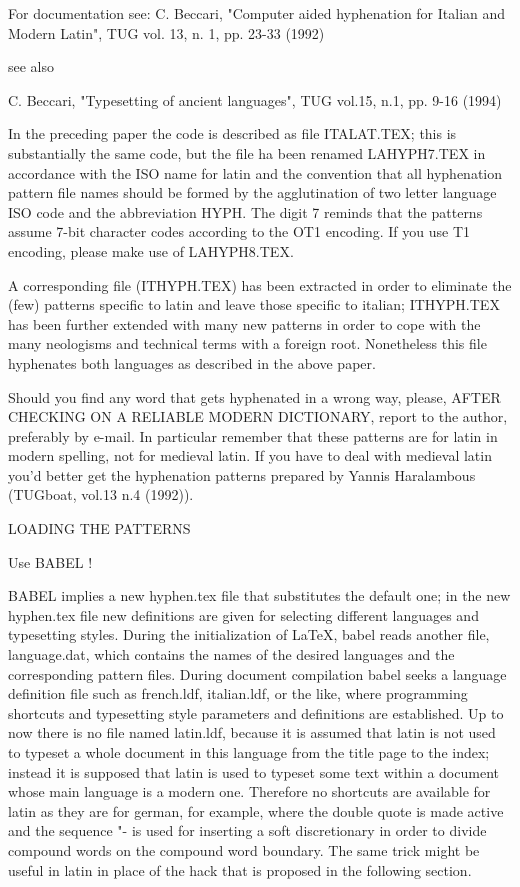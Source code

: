  For documentation see:
 C. Beccari, "Computer aided hyphenation for Italian and Modern
       Latin", TUG vol. 13, n. 1, pp. 23-33 (1992)

 see also

 C. Beccari, "Typesetting of ancient languages",
             TUG vol.15, n.1, pp. 9-16 (1994)

 In the preceding paper the code is described as file ITALAT.TEX; this is
 substantially the same code, but the file ha been renamed LAHYPH7.TEX
 in accordance with the ISO name for latin and the convention that all
 hyphenation pattern file names should be formed by the agglutination of
 two letter language ISO code and the abbreviation HYPH. The digit 7
 reminds that the patterns assume 7-bit character codes according to the
 OT1 encoding. If you use T1 encoding, please make use of LAHYPH8.TEX.

 A corresponding file (ITHYPH.TEX) has been extracted in order to eliminate
 the (few) patterns specific to latin and leave those specific to italian;
 ITHYPH.TEX has been further extended with many new patterns in order to
 cope with the many neologisms and technical terms with a foreign root.
 Nonetheless this file hyphenates both languages as described in the above
 paper.

 Should you find any word that gets hyphenated in a wrong way, please, AFTER
 CHECKING ON A RELIABLE MODERN DICTIONARY, report to the author, preferably
 by e-mail. In particular remember that these patterns are for latin in
 modern spelling, not for medieval latin. If you have to deal with medieval
 latin you'd better get the hyphenation patterns prepared by Yannis
 Haralambous (TUGboat, vol.13 n.4 (1992)).

 LOADING THE PATTERNS

 Use BABEL !

 BABEL implies a new hyphen.tex file that substitutes the default one; in
 the new hyphen.tex file new definitions are given for selecting different
 languages and typesetting styles. During the initialization of LaTeX,
 babel reads another  file, language.dat, which contains the names of
 the desired languages and the corresponding pattern files. During
 document compilation babel seeks a language definition file such as
 french.ldf, italian.ldf, or the like, where programming shortcuts and
 typesetting style parameters and definitions are established. Up to now
 there is no file named latin.ldf, because it is assumed that latin
 is not used to typeset a whole document in this language from the title
 page to the index; instead it is supposed that latin is used to typeset
 some text within a document whose main language is a modern one.
 Therefore no shortcuts are available for latin as they are for german,
 for example, where the double quote is made active and the sequence "- is
 used for inserting a soft discretionary in order to divide compound words
 on the compound word boundary. The same trick might be useful in latin in
 place of the hack that is proposed in the following section.

